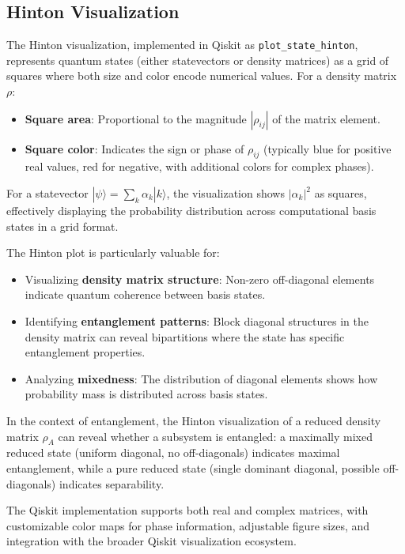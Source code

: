 \documentclass[%
 amsmath,amssymb,
 aps,
rmp,
]{revtex4-2}
\begin{document}


\subsection{Hinton Visualization}
\label{sec:hinton}

The Hinton visualization, implemented in Qiskit as \texttt{plot\_state\_hinton}, represents quantum states (either statevectors or density matrices) as a grid of squares where both size and color encode numerical values. For a density matrix $\rho$:
\begin{itemize}
	\item \textbf{Square area}: Proportional to the magnitude $|\rho_{ij}|$ of the matrix element.
	\item \textbf{Square color}: Indicates the sign or phase of $\rho_{ij}$ (typically blue for positive real values, red for negative, with additional colors for complex phases).
\end{itemize}

For a statevector $|\psi\rangle = \sum_k \alpha_k |k\rangle$, the visualization shows $|\alpha_k|^2$ as squares, effectively displaying the probability distribution across computational basis states in a grid format.

The Hinton plot is particularly valuable for:
\begin{itemize}
	\item Visualizing \textbf{density matrix structure}: Non-zero off-diagonal elements indicate quantum coherence between basis states.
	\item Identifying \textbf{entanglement patterns}: Block diagonal structures in the density matrix can reveal bipartitions where the state has specific entanglement properties.
	\item Analyzing \textbf{mixedness}: The distribution of diagonal elements shows how probability mass is distributed across basis states.
\end{itemize}

In the context of entanglement, the Hinton visualization of a reduced density matrix $\rho_A$ can reveal whether a subsystem is entangled: a maximally mixed reduced state (uniform diagonal, no off-diagonals) indicates maximal entanglement, while a pure reduced state (single dominant diagonal, possible off-diagonals) indicates separability.



The Qiskit implementation supports both real and complex matrices, with customizable color maps for phase information, adjustable figure sizes, and integration with the broader Qiskit visualization ecosystem.
\end{document}
